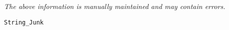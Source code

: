 \label{pkg:string\_junk}

{\tiny \it The above information is manually maintained and may contain errors.}
\begin{verbatim}
String_Junk
\end{verbatim}
